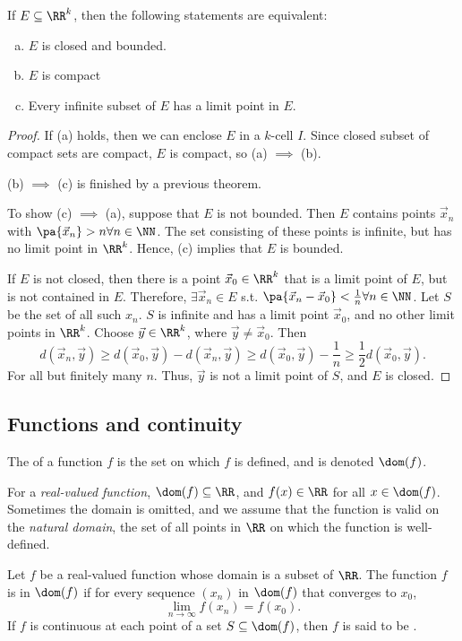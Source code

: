 \documentclass[11pt]{scrartcl}
\numberwithin{equation}{section}
\begin{document}
\begin{theorem}
    \label{thm:heineborelthm}
    If $E\subseteq \RR^k$, then the following statements are equivalent:
    \begin{enumerate}[(a)]
        \item $E$ is closed and bounded.
        \item $E$ is compact 
        \item Every infinite subset of $E$ has a limit point in $E$.
    \end{enumerate}
\end{theorem}
\begin{proof}
    If (a) holds, then we can enclose $E$ in a $k$-cell $I$.
    Since closed subset of compact sets are compact, $E$ is compact,
    so (a) $\implies$ (b).

    (b) $\implies$ (c) is finished by a previous theorem.

    To show (c) $\implies$ (a), suppose that $E$ is not bounded.
    Then $E$ contains points $\vec{x}_n$ with 
    $\pa{\vec{x}_n}>n\forall n \in \NN$. The set consisting of 
    these points is infinite, but has no limit point in $\RR^k$.
    Hence, (c) implies that $E$ is bounded. 
    
    If $E$ is not closed, 
    then there is a point $\vec{x}_0\in \RR^k$ that is a limit point of $E$,
    but is not contained in $E$. Therefore, $\exists \vec{x}_n\in E$ s.t.
    $\pa{\vec{x}_n-\vec{x}_0}<\frac{1}{n}\forall n \in \NN$.
    Let $S$ be the set of all such $x_n$.
    $S$ is infinite and has a limit point $\vec{x}_0$, and no other limit points in $\RR^k$. Choose $\vec{y}\in\RR^k$, where $\vec{y}\neq \vec{x}_0$.
    Then 
    \[ d(\vec{x}_n,\vec{y})\geq d(\vec{x}_0,\vec{y})-d(\vec{x}_n,\vec{y})
    \geq d(\vec{x}_0,\vec{y})-\frac{1}{n}\geq \frac{1}{2}d(\vec{x}_0,\vec{y}).\]
    For all but finitely many $n$. Thus, $\vec{y}$ is not a limit point of 
    $S$, and $E$ is closed.
\end{proof}
\subsection{Functions and continuity}
\begin{definition}
    The  of a function $f$ is the set on which $f$ is defined,
    and is denoted $\dom(f)$.
\end{definition}
For a \textit{real-valued function}, $\dom(f)\subseteq \RR$, and $f(x)\in\RR$ for 
all $x\in\dom(f)$. Sometimes the domain is omitted, and we 
assume that the function is valid on the \textit{natural domain},
the set of all points in $\RR$ on which the function is well-defined.
\begin{definition}
    Let $f$ be a real-valued function whose domain is a subset of $\RR$.
    The function $f$ is  in $\dom(f)$ if 
    for every sequence $(x_n)$ in $\dom(f)$ that converges 
    to $x_0$,  
    \[\lim_{n\rightarrow \infty}f(x_n)=f(x_0). \]
    If $f$ is continuous at each point of a set $S\subseteq \dom(f)$, 
    then $f$ is said to be .
\end{definition}
\clearpage
\end{document}
